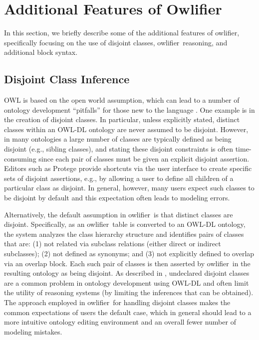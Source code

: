 \documentclass[preprint,number]{elsarticle}
\newcommand{\Owlifier}{\textsf{Owlifier}}
\newcommand{\owlifier}{\textsf{owlifier}}
\begin{document}
\section{Additional Features of \Owlifier}
\label{sec:features}

In this section, we briefly describe some of the additional features
of \owlifier, specifically focusing on the use of disjoint classes,
\owlifier\ reasoning, and additional block syntax.
 
\subsection{Disjoint Class Inference}

OWL is based on the open world assumption, which can lead to a number
of ontology development ``pitfalls'' for those new to the language
\cite{smith04:_owl_web_ontol_languag_guide,rector04:_owl_pizzas}. One
example is in the creation of disjoint classes.  In particular, unless
explicitly stated, distinct classes within an OWL-DL ontology are
never assumed to be disjoint. However, in many ontologies a large
number of classes are typically defined as being disjoint (e.g.,
sibling classes), and stating these disjoint constraints is often
time-consuming since each pair of classes must be given an explicit
disjoint assertion. Editors such as Protege
\cite{knublauch04:_editin_descr_logic_ontol_with} provide shortcuts
via the user interface to create specific sets of disjoint assertions,
e.g., by allowing a user to define all children of a particular class
as disjoint. In general, however, many users expect such classes to be
disjoint by default \cite{rector04:_owl_pizzas} and this expectation
often leads to modeling errors.

Alternatively, the default assumption in \owlifier\ is that distinct
classes are disjoint. Specifically, as an \owlifier\ table is
converted to an OWL-DL ontology, the system analyzes the class
hierarchy structure and identifies pairs of classes that are: (1) not
related via subclass relations (either direct or indirect subclasses);
(2) not defined as synonyms; and (3) not explicitly defined to overlap
via an overlap block. Each such pair of classes is then asserted by
\owlifier\ in the resulting ontology as being disjoint. As described
in \cite{rector04:_owl_pizzas}, undeclared disjoint classes are a
common problem in ontology development using OWL-DL and often limit
the utility of reasoning systems (by limiting the inferences that can
be obtained). The approach employed in \owlifier\ for handling
disjoint classes makes the common expectations of users the default
case, which in general should lead to a more intuitive ontology
editing environment and an overall fewer number of modeling mistakes.
\end{document}
